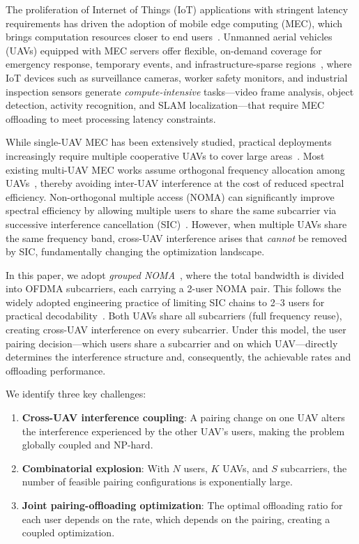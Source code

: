 \documentclass[journal]{IEEEtran}
\begin{document}
The proliferation of Internet of Things (IoT) applications with stringent latency requirements has driven the adoption of mobile edge computing (MEC), which brings computation resources closer to end users~\cite{mao2017survey}.
Unmanned aerial vehicles (UAVs) equipped with MEC servers offer flexible, on-demand coverage for emergency response, temporary events, and infrastructure-sparse regions~\cite{zeng2016uav}, where IoT devices such as surveillance cameras, worker safety monitors, and industrial inspection sensors generate \emph{compute-intensive} tasks---video frame analysis, object detection, activity recognition, and SLAM localization---that require MEC offloading to meet processing latency constraints.

While single-UAV MEC has been extensively studied, practical deployments increasingly require multiple cooperative UAVs to cover large areas~\cite{wu2018joint}.
Most existing multi-UAV MEC works assume orthogonal frequency allocation among UAVs~\cite{ma2024dynamic,zhang2023cooperative,wu2018joint}, thereby avoiding inter-UAV interference at the cost of reduced spectral efficiency.
Non-orthogonal multiple access (NOMA) can significantly improve spectral efficiency by allowing multiple users to share the same subcarrier via successive interference cancellation (SIC)~\cite{ding2017survey}.
However, when multiple UAVs share the same frequency band, cross-UAV interference arises that \emph{cannot} be removed by SIC, fundamentally changing the optimization landscape.

In this paper, we adopt \emph{grouped NOMA}~\cite{ali2016dynamic}, where the total bandwidth is divided into OFDMA subcarriers, each carrying a 2-user NOMA pair.
This follows the widely adopted engineering practice of limiting SIC chains to 2--3 users for practical decodability~\cite{saito2013non}.
Both UAVs share all subcarriers (full frequency reuse), creating cross-UAV interference on every subcarrier.
Under this model, the user pairing decision---which users share a subcarrier and on which UAV---directly determines the interference structure and, consequently, the achievable rates and offloading performance.

We identify three key challenges:
\begin{enumerate}
    \item \textbf{Cross-UAV interference coupling}: A pairing change on one UAV alters the interference experienced by the other UAV's users, making the problem globally coupled and NP-hard.
    \item \textbf{Combinatorial explosion}: With $N$ users, $K$ UAVs, and $S$ subcarriers, the number of feasible pairing configurations is exponentially large.
    \item \textbf{Joint pairing-offloading optimization}: The optimal offloading ratio for each user depends on the rate, which depends on the pairing, creating a coupled optimization.
\end{enumerate}
\end{document}
